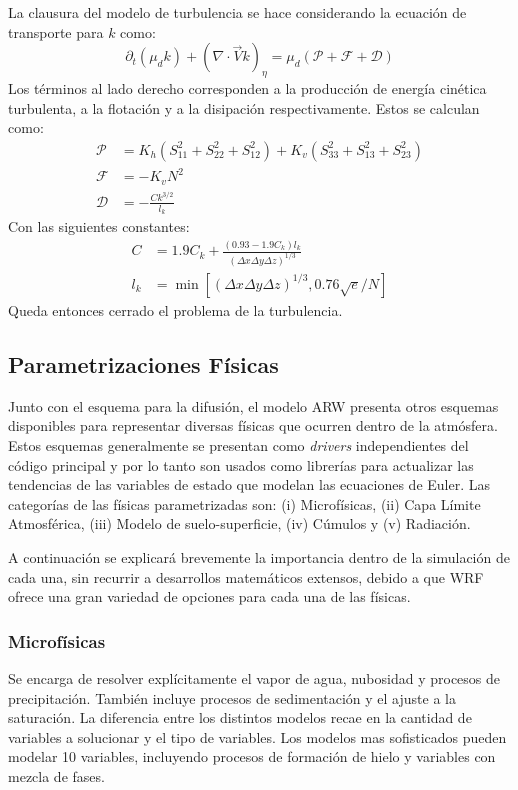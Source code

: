 La clausura del modelo de turbulencia se hace considerando la ecuación de transporte para $k$ como:
\begin{equation}
\partial_t(\mu_d k) + (\nabla\cdot\vec{V}k)_\eta = \mu_d(\mathcal{P} + \mathcal{F} + \mathcal{D})
\end{equation}
Los términos al lado derecho corresponden a la producción de energía cinética turbulenta, a la flotación y a la disipación respectivamente. Estos se calculan como:
\begin{align}
	\mathcal{P}&= K_h (S_{11}^2 + S_{22}^2 + S_{12}^2) + K_v (S_{33}^2 + S_{13}^2 + S_{23}^2)\\
	\mathcal{F}&=-K_v N^2\\
	\mathcal{D}&=-\frac{C k^{3/2}}{l_k}
\end{align}
Con las siguientes constantes:
\begin{align}
	C &= 1.9C_k + \frac{(0.93 - 1.9 C_k)l_k}{(\Delta x \Delta y \Delta z)^{1/3}}\\
	l_k &= \min[(\Delta x \Delta y \Delta z)^{1/3}, 0.76\sqrt{e}/N]
\end{align}
Queda entonces cerrado el problema de la turbulencia.

\subsection{Parametrizaciones Físicas}
Junto con el esquema para la difusión, el modelo ARW presenta otros esquemas disponibles para representar diversas físicas que ocurren dentro de la atmósfera. Estos esquemas generalmente se presentan como \emph{drivers} independientes del código principal y por lo tanto son usados como librerías para actualizar las tendencias de las variables de estado que modelan las ecuaciones de Euler. Las categorías de las físicas parametrizadas son: (i) Microfísicas, (ii) Capa Límite Atmosférica, (iii) Modelo de suelo-superficie, (iv) Cúmulos y (v) Radiación.

A continuación se explicará brevemente la importancia dentro de la simulación de cada una, sin recurrir a desarrollos matemáticos extensos, debido a que WRF ofrece una gran variedad de opciones para cada una de las físicas.
\subsubsection{Microfísicas}
Se encarga de resolver explícitamente el vapor de agua, nubosidad y procesos de precipitación. También incluye procesos de sedimentación y el ajuste a la saturación. La diferencia entre los distintos modelos recae en la cantidad de variables a solucionar y el tipo de variables. Los modelos mas sofisticados pueden modelar 10 variables, incluyendo procesos de formación de hielo y variables con mezcla de fases.
